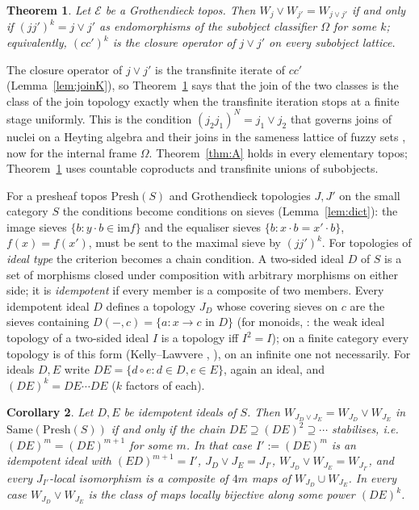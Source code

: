 \documentclass[11pt]{amsart}
\newtheorem{thm}{Theorem}[section]
\newtheorem{cor}[thm]{Corollary}
\theoremstyle{definition}
\newcommand{\Same}{\mathrm{Same}}
\newcommand{\Presh}{\mathrm{Presh}}
\newcommand{\im}{\mathrm{im}}
\newcommand{\cE}{\mathcal E}
\begin{document}
\begin{thm}\label{thm:B}
Let $\cE$ be a Grothendieck topos. Then $W_j\vee W_{j'}=W_{j\vee j'}$ if and
only if $(jj')^k=j\vee j'$ as endomorphisms of the subobject classifier
$\Omega$ for some $k$; equivalently, $(cc')^k$ is the closure operator of
$j\vee j'$ on every subobject lattice.
\end{thm}

The closure operator of $j\vee j'$ is the transfinite iterate of $cc'$
(Lemma~\ref{lem:joinK}), so Theorem~\ref{thm:B} says that the join of the two
classes is the class of the join topology exactly when the transfinite
iteration stops at a finite stage uniformly. This is the condition
$(j_2j_1)^N=j_1\vee j_2$ that governs joins of nuclei on a Heyting algebra and
their joins in the sameness lattice of fuzzy sets \cite{Laxjoin,Fuzzysame}, now
for the internal frame $\Omega$. Theorem~\ref{thm:A} holds in every
elementary topos; Theorem~\ref{thm:B} uses countable coproducts and
transfinite unions of subobjects.

For a presheaf topos $\Presh(S)$ and Grothendieck topologies $J,J'$ on the
small category $S$ the conditions become conditions on sieves
(Lemma~\ref{lem:dict}): the image sieves $\{b:y\cdot b\in\im f\}$ and the
equaliser sieves $\{b:x\cdot b=x'\cdot b\}$, $f(x)=f(x')$, must be sent to the
maximal sieve by $(jj')^k$. For topologies of \emph{ideal type} the
criterion becomes a chain condition. A two-sided ideal $D$ of $S$ is a set of
morphisms closed under composition with arbitrary morphisms on either side;
it is \emph{idempotent} if every member is a composite of two members. Every
idempotent ideal $D$ defines a topology $J_D$ whose covering sieves on $c$
are the sieves containing $D(-,c)=\{a\colon x\to c\text{ in }D\}$
\cite[Thm.~5.1]{Postnikov} (for monoids, \cite[Thm.~2.9]{KM}: the weak
ideal topology of a two-sided ideal $I$ is a topology iff $I^2=I$); on a
finite category every topology is of this form (Kelly--Lawvere \cite{KL89},
\cite{Marques25}), on an infinite one not necessarily. For ideals $D,E$ write $DE=\{d\circ e:d\in D,e\in E\}$, again an
ideal, and $(DE)^k=DE\cdots DE$ ($k$ factors of each).

\begin{cor}\label{cor:ideal}
Let $D,E$ be idempotent ideals of $S$. Then $W_{J_D\vee J_E}=W_{J_D}\vee
W_{J_E}$ in $\Same(\Presh(S))$ if and only if the chain $DE\supseteq(DE)^2
\supseteq\cdots$ stabilises, i.e.\ $(DE)^m=(DE)^{m+1}$ for some $m$. In that
case $I':=(DE)^m$ is an idempotent ideal with $(ED)^{m+1}=I'$,
$J_D\vee J_E=J_{I'}$, $W_{J_D}\vee W_{J_E}=W_{J_{I'}}$, and every
$J_{I'}$-local isomorphism is a composite of $4m$ maps of
$W_{J_D}\cup W_{J_E}$. In every case $W_{J_D}\vee W_{J_E}$ is the class of
maps locally bijective along some power $(DE)^k$.
\end{cor}
\end{document}
